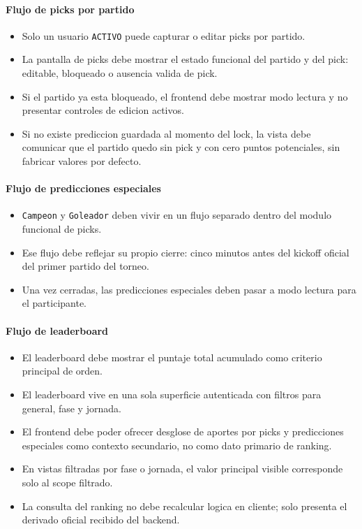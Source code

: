 \paragraph{Flujo de picks por partido}

\begin{itemize}
  \item Solo un usuario \texttt{ACTIVO} puede capturar o editar picks por partido.
  \item La pantalla de picks debe mostrar el estado funcional del partido y del pick: editable, bloqueado o ausencia valida de pick.
  \item Si el partido ya esta bloqueado, el frontend debe mostrar modo lectura y no presentar controles de edicion activos.
  \item Si no existe prediccion guardada al momento del lock, la vista debe comunicar que el partido quedo sin pick y con cero puntos potenciales, sin fabricar valores por defecto.
\end{itemize}

\paragraph{Flujo de predicciones especiales}

\begin{itemize}
  \item \texttt{Campeon} y \texttt{Goleador} deben vivir en un flujo separado dentro del modulo funcional de picks.
  \item Ese flujo debe reflejar su propio cierre: cinco minutos antes del kickoff oficial del primer partido del torneo.
  \item Una vez cerradas, las predicciones especiales deben pasar a modo lectura para el participante.
\end{itemize}

\paragraph{Flujo de leaderboard}

\begin{itemize}
  \item El leaderboard debe mostrar el puntaje total acumulado como criterio principal de orden.
  \item El leaderboard vive en una sola superficie autenticada con filtros para general, fase y jornada.
  \item El frontend debe poder ofrecer desglose de aportes por picks y predicciones especiales como contexto secundario, no como dato primario de ranking.
  \item En vistas filtradas por fase o jornada, el valor principal visible corresponde solo al scope filtrado.
  \item La consulta del ranking no debe recalcular logica en cliente; solo presenta el derivado oficial recibido del backend.
\end{itemize}

